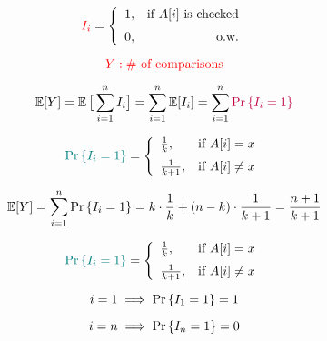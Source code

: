 \begin{frame}{}
  \centerline{}

  \pause
  \[
    \textcolor{red}{I_{i}} = \left\{\begin{array}{lr}
      1, & \text{if } A[i] \text{ is checked} \\[6pt]
      0, & \text{o.w.}
    \end{array}\right.
  \]

  \pause
  \[
    \textcolor{red}{Y: \# \text{ of comparisons}}
  \]

  \pause
  \[
    \operatorname*{\mathbb{E}}[Y] = \operatorname*{\mathbb{E}}\big[\sum_{i=1}^{n} I_{i}\big] = \sum_{i=1}^{n} \operatorname*{\mathbb{E}}[I_{i}] = \sum_{i=1}^{n} \textcolor{purple}{\Pr\left\{I_{i} = 1\right\}}
  \]

  \pause
  \[
    \textcolor{teal}{\Pr\left\{I_{i} = 1\right\}} = \left\{\begin{array}{lr}
      \frac{1}{k}, & \text{if } A[i] = x \\[6pt]
      \frac{1}{k+1}, & \text{if } A[i] \neq x
    \end{array}\right.
  \]

  \pause
  \[
    \operatorname*{\mathbb{E}}[Y] = \sum_{i=1}^{n} \Pr\left\{I_{i} = 1\right\} = k \cdot \frac{1}{k} + (n-k) \cdot \frac{1}{k+1} = \frac{n+1}{k+1}
  \]
\end{frame}

\begin{frame}{}

  \pause
  \[
    \textcolor{teal}{\Pr\left\{I_{i} = 1\right\}} = \left\{\begin{array}{lr}
      \frac{1}{k}, & \text{if } A[i] = x \\[6pt]
      \frac{1}{k+1}, & \text{if } A[i] \neq x
    \end{array}\right.
  \]

  \pause
  \vspace{0.20cm}
  \[
    i = 1 \implies \Pr\left\{I_{1} = 1\right\} = 1
  \]

  \pause
  \vspace{-0.50cm}
  \[
    i = n \implies \Pr\left\{I_{n} = 1\right\} = 0
  \]

  \pause
  \begin{center}
    {}\\
    {}
  \end{center}
\end{frame}

